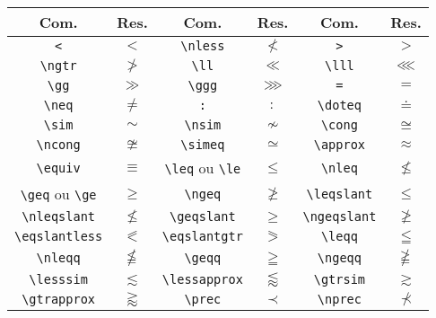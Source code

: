 % 
% 
% 
% 
% 
\begin{tabular}{cc|cc|cc}
    \hline
    Com. & Res. & Com. & Res. & Com. & Res. \\ \hline
    \lstinline!<! & $<$ & \lstinline!\nless! & $\nless$ & \lstinline!>! & $>$ \\
    \lstinline!\ngtr! & $\ngtr$ & \lstinline!\ll! & $\ll$ & \lstinline!\lll! & $\lll$ \\
    \lstinline!\gg! & $\gg$ & \lstinline!\ggg! & $\ggg$ & \lstinline!=! & $=$ \\
    \lstinline!\neq! & $\neq$ & \lstinline!:! & $:$ & \lstinline!\doteq! & $\doteq$ \\
    \lstinline!\sim! & $\sim$ & \lstinline!\nsim! & $\nsim$ & \lstinline!\cong! & $\cong$ \\
    \lstinline!\ncong! & $\ncong$ & \lstinline!\simeq! & $\simeq$ & \lstinline!\approx! & $\approx$ \\
    \lstinline!\equiv! & $\equiv$ & \lstinline!\leq! ou \lstinline!\le! & $\leq$ & \lstinline!\nleq! & $\nleq$ \\
    \lstinline!\geq! ou \lstinline!\ge! & $\geq$ & \lstinline!\ngeq! & $\ngeq$ & \lstinline!\leqslant! & $\leqslant$ \\
    \lstinline!\nleqslant! & $\nleqslant$ & \lstinline!\geqslant! & $\geqslant$ & \lstinline!\ngeqslant! & $\ngeqslant$ \\
    \lstinline!\eqslantless! & $\eqslantless$ & \lstinline!\eqslantgtr! & $\eqslantgtr$ & \lstinline!\leqq! & $\leqq$ \\
    \lstinline!\nleqq! & $\nleqq$ & \lstinline!\geqq! & $\geqq$ & \lstinline!\ngeqq! & $\ngeqq$ \\
    \lstinline!\lesssim! & $\lesssim$ & \lstinline!\lessapprox! & $\lessapprox$ & \lstinline!\gtrsim! & $\gtrsim$ \\
    \lstinline!\gtrapprox! & $\gtrapprox$ & \lstinline!\prec! & $\prec$ & \lstinline!\nprec! & $\nprec$ \\

\end{tabular}
